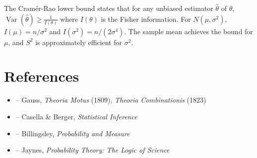 \begin{solution}
The Cramér-Rao lower bound states that for any unbiased estimator $\hat{\theta}$ of $\theta$, $\operatorname{Var}(\hat{\theta}) \geq \frac{1}{I(\theta)}$ where $I(\theta)$ is the Fisher information. For $N(\mu, \sigma^2)$, $I(\mu) = n/\sigma^2$ and $I(\sigma^2) = n/(2\sigma^4)$. The sample mean achieves the bound for $\mu$, and $S^2$ is approximately efficient for $\sigma^2$.
\end{solution}


\section{References}

\begin{itemize}
    \item \cite{gauss-theoria} -- Gauss, \textit{Theoria Motus} (1809), \textit{Theoria Combinationis} (1823)
    \item \cite{casella-berger} -- Casella \& Berger, \textit{Statistical Inference}
    \item \cite{billingsley} -- Billingsley, \textit{Probability and Measure}
    \item \cite{jaynes} -- Jaynes, \textit{Probability Theory: The Logic of Science}
\end{itemize}
